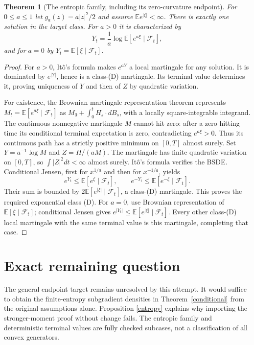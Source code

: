 \documentclass[11pt]{article}
\newtheorem{theorem}{Theorem}
\newcommand{\E}{\mathbb E}
\newcommand{\F}{\mathcal F}
\begin{document}
\begin{theorem}[The entropic family, including its zero-curvature endpoint]
For $0\leq a\leq1$ let $g_a(z)=a|z|^2/2$ and assume
$\E e^{|\xi|}<\infty$. There is exactly one solution in the target class.
For $a>0$ it is characterized by
\[
 Y_t=\frac1a\log\E[e^{a\xi}\mid\F_t],
\]
and for $a=0$ by $Y_t=\E[\xi\mid\F_t]$.
\end{theorem}
\begin{proof}
For $a>0$, It\^o's formula makes $e^{aY}$ a local martingale for
any solution. It is dominated by $e^{|Y|}$, hence is a class-(D)
martingale. Its terminal value determines it, proving uniqueness of $Y$
and then of $Z$ by quadratic variation.

For existence, the Brownian martingale representation theorem represents
$M_t=\E[e^{a\xi}\mid\F_t]$ as $M_0+\int_0^tH_s\cdot dB_s$,
with a locally square-integrable integrand. The continuous nonnegative
martingale $M$ cannot hit zero: after a zero hitting time its conditional
terminal expectation is zero, contradicting $e^{a\xi}>0$.
Thus its continuous path has a strictly positive minimum on $[0,T]$
almost surely. Set $Y=a^{-1}\log M$ and $Z=H/(aM)$.
The martingale has finite quadratic variation on $[0,T]$, so
$\int|Z|^2dt<\infty$ almost surely. It\^o's formula verifies the BSDE.
Conditional Jensen, first for $x^{1/a}$ and then for $x^{-1/a}$, yields
\[
 e^{Y_t}\leq\E[e^\xi\mid\F_t],\qquad
 e^{-Y_t}\leq\E[e^{-\xi}\mid\F_t].
\]
Their sum is bounded by $2\E[e^{|\xi|}\mid\F_t]$, a class-(D)
martingale. This proves the required exponential class (D).
For $a=0$, use Brownian representation of $\E[\xi\mid\F_t]$;
conditional Jensen gives $e^{|Y_t|}\leq\E[e^{|\xi|}\mid\F_t]$.
Every other class-(D) local martingale with the same terminal value is
this martingale, completing that case.
\end{proof}

\section{Exact remaining question}
The general endpoint target remains unresolved by this attempt. It would
suffice to obtain the finite-entropy subgradient densities in
Theorem~\ref{conditional} from the original assumptions alone. Proposition
\ref{entropy} explains why importing the stronger-moment proof without
change fails. The entropic family and deterministic terminal values are
fully checked subcases, not a classification of all convex generators.
\end{document}
